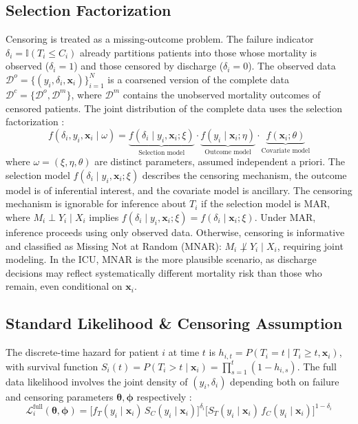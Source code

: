 \documentclass[twoside,11pt]{article}
\newcommand{\ind}{\mathbb{I}}
\newcommand{\bx}{\mathbf{x}}
\begin{document}
\subsection{Selection Factorization}
Censoring is treated as a missing-outcome problem. The failure indicator $\delta_i = \ind(T_i \le C_i)$ already partitions patients into those whose mortality is observed ($\delta_i = 1$) and those censored by discharge ($\delta_i = 0$). The observed data $\mathcal{D}^o = \{(y_i, \delta_i, \bx_i)\}_{i=1}^N$ is a coarsened version of the complete data $\mathcal{D}^c = \{ \mathcal{D}^o, \mathcal{D}^m \}$, where $\mathcal{D}^m$ contains the unobserved mortality outcomes of censored patients. The joint distribution of the complete data uses the selection factorization \citep{rubin1976,oganisian}:
\begin{equation}\label{eq:selection-factorization}
    f(\delta_i , y_i, \bx_i \mid \omega) = \underbrace{f( \delta_i \mid y_i, \bx_i; \xi )}_{\text{Selection model}} \cdot \underbrace{f(y_i \mid \bx_i; \eta )}_{\text{Outcome model}} \cdot \underbrace{f(\bx_i; \theta )}_{\text{Covariate model}}
\end{equation}
where $\omega = (\xi, \eta, \theta)$ are distinct parameters, assumed independent a priori. The selection model $f(\delta_i \mid y_i, \bx_i; \xi )$ describes the censoring mechanism, the outcome model is of inferential interest, and the covariate model is ancillary. The censoring mechanism is ignorable for inference about $T_i$ if the selection model is MAR, where $M_i \perp Y_i \mid X_i$ implies $f(\delta_i \mid y_i, \bx_i; \xi ) = f(\delta_i \mid \bx_i; \xi )$. Under MAR, inference proceeds using only observed data. Otherwise, censoring is informative and classified as Missing Not at Random (MNAR): $M_i \not\perp Y_i \mid X_i$, requiring joint modeling. In the ICU, MNAR is the more plausible scenario, as discharge decisions may reflect systematically different mortality risk than those who remain, even conditional on $\bx_i$.
 
 
\subsection{Standard Likelihood \& Censoring Assumption} \label{sc:naive-likelihood}
The discrete-time hazard for patient $i$ at time $t$ is $h_{i,t} = P(T_i = t \mid T_i \geq t, \mathbf{x}_i)$, with survival function $S_i(t) = P(T_i > t \mid \mathbf{x}_i) = \prod_{s=1}^t (1 - h_{i,s})$. The full data likelihood involves the joint density of $(y_i, \delta_i)$ depending both on failure and censoring parameters $\boldsymbol{\theta}, \boldsymbol{\phi}$ respectively \citep[Section 3.2]{kalbfleisch2003statistical}:
\begin{equation}\label{eq:full-lik}
    \mathcal{L}_i^{\text{full}}(\boldsymbol{\theta}, \boldsymbol{\phi})
    = \bigl[f_T(y_i \mid \bx_i)\, S_C(y_i \mid \bx_i)\bigr]^{\delta_i}
      \bigl[S_T(y_i \mid \bx_i)\, f_C(y_i \mid \bx_i)\bigr]^{1 - \delta_i}
\end{equation}
 
\end{document}
